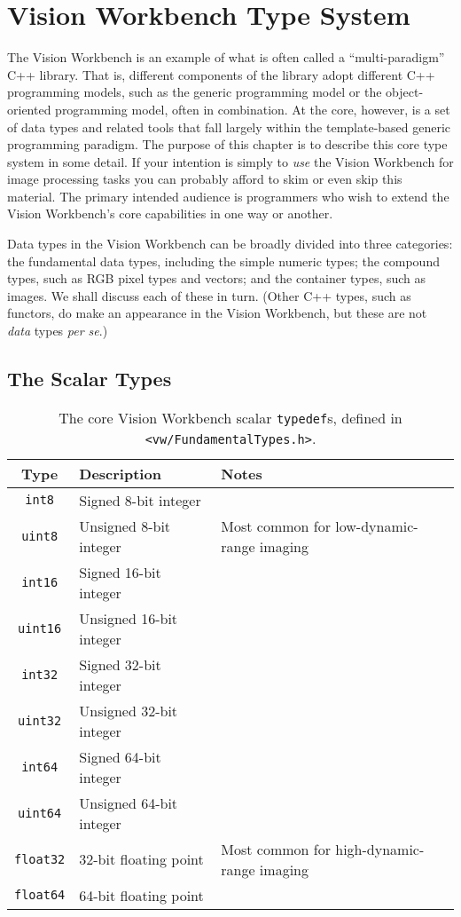 \chapter{Vision Workbench Type System}

The Vision Workbench is an example of what is often called a
``multi-paradigm'' C++ library.  That is, different components of the
library adopt different C++ programming models, such as the generic
programming model or the object-oriented programming model, often in
combination.  At the core, however, is a set of data types and related
tools that fall largely within the template-based generic programming
paradigm.  The purpose of this chapter is to describe this core type
system in some detail.  If your intention is simply to {\it use} the
Vision Workbench for image processing tasks you can probably afford
to skim or even skip this material.  The primary intended audience is
programmers who wish to extend the Vision Workbench's core
capabilities in one way or another.

Data types in the Vision Workbench can be broadly divided into three
categories: the fundamental data types, including the simple numeric
types; the compound types, such as RGB pixel types and vectors; and
the container types, such as images.  We shall discuss each of these
in turn.  (Other C++ types, such as functors, do make an appearance in
the Vision Workbench, but these are not {\it data} types {\it per se}.)

\section{The Scalar Types}

\begin{table}[t]\begin{centering}
\begin{tabular}{|c|l|l|} \hline
Type & Description & Notes \\ \hline \hline
\verb#int8# & Signed 8-bit integer & \\ \hline
\verb#uint8# & Unsigned 8-bit integer & Most common for low-dynamic-range imaging \\ \hline
\verb#int16# & Signed 16-bit integer & \\ \hline
\verb#uint16# & Unsigned 16-bit integer & \\ \hline
\verb#int32# & Signed 32-bit integer & \\ \hline
\verb#uint32# & Unsigned 32-bit integer & \\ \hline
\verb#int64# & Signed 64-bit integer & \\ \hline
\verb#uint64# & Unsigned 64-bit integer & \\ \hline
\verb#float32# & 32-bit floating point & Most common for high-dynamic-range imaging \\ \hline
\verb#float64# & 64-bit floating point & \\ \hline
\end{tabular}
\caption{The core Vision Workbench scalar {\tt typedef}s, defined in {\tt <vw/FundamentalTypes.h>}.}
\label{tbl:scalar-types}
\end{centering}\end{table}

